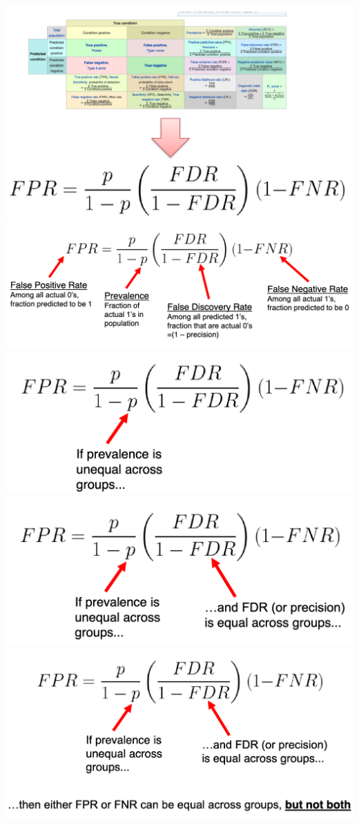 \documentclass[11pt]{article}
\theoremstyle{definition}
\begin{document}
\includegraphics[width=\textwidth/2]{6.png}
\includegraphics[width=\textwidth/2]{7.png}
\includegraphics[width=\textwidth/2]{8.png}
\includegraphics[width=\textwidth/2]{9.png}
\includegraphics[width=\textwidth/2]{10.png}
\end{document}
